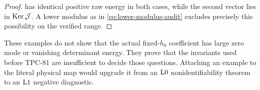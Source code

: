 \begin{proof}
 has identical positive raw energy in both
cases, while the second vector lies in \(\operatorname{Ker}\mathcal J\).  A lower modulus
as in \eqref{eq:lower-modulus-audit} excludes precisely this
possibility on the verified range.
\end{proof}

\begin{remark}
These examples do not show that the actual fixed-\(h_0\) coefficient
has large zero mode or vanishing determinant energy.  They prove that
the invariants used before TPC-81 are insufficient to decide those
questions.  Attaching an example to the literal physical map would
upgrade it from an \(\mathrm{L0}\) nonidentifiability theorem to an
\(\mathrm{L1}\) negative diagnostic.
\end{remark}
